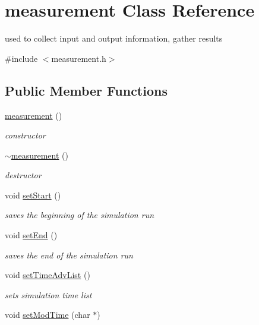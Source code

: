 \hypertarget{classmeasurement}{\section{measurement \-Class \-Reference}
\label{classmeasurement}
}


used to collect input and output information, gather results  




{\ttfamily \#include $<$measurement.\-h$>$}

\subsection*{\-Public \-Member \-Functions}
\begin{DoxyCompactItemize}
\item 
\hyperlink{classmeasurement_a94ea175b4a5eecf4c60af94b7d630ca0}{measurement} ()
\begin{DoxyCompactList}\small\item\em constructor \end{DoxyCompactList}\item 
\hyperlink{classmeasurement_adad6fad962fe7f356188e2d108069ab9}{$\sim$measurement} ()
\begin{DoxyCompactList}\small\item\em destructor \end{DoxyCompactList}\item 
void \hyperlink{classmeasurement_a18541883e2ecd3b899577809bc318987}{set\-Start} ()
\begin{DoxyCompactList}\small\item\em saves the beginning of the simulation run \end{DoxyCompactList}\item 
void \hyperlink{classmeasurement_adfeee2a53faaa6c4de885f274e31e84f}{set\-End} ()
\begin{DoxyCompactList}\small\item\em saves the end of the simulation run \end{DoxyCompactList}\item 
void \hyperlink{classmeasurement_ab92b9dab0ee6ac312170b5536858fc8c}{set\-Time\-Adv\-List} ()
\begin{DoxyCompactList}\small\item\em sets simulation time list \end{DoxyCompactList}\item 
void \hyperlink{classmeasurement_ae5af86c6b09d4bc3bd8f648c371a3f9c}{set\-Mod\-Time} (char $\ast$)

\end{DoxyCompactItemize}
